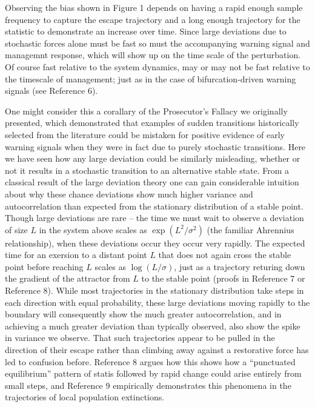 \documentclass[review]{elsarticle} %
\begin{document}
Observing the bias shown in Figure 1 depends on having a rapid enough
sample frequency to capture the escape trajectory and a long enough
trajectory for the statistic to demonstrate an increase over time. Since
large deviations due to stochastic forces alone must be fast so must the
accompanying warning signal and managemnt response, which will show up
on the time scale of the perturbation. Of course fast relative to the
system dynamics, may or may not be fast relative to the timescale of
management; just as in the case of bifurcation-driven warning signals
(see Reference 6).

One might consider this a corallary of the Prosecutor's Fallacy we
originally presented, which demonstrated that examples of sudden
transitions historically selected from the literature could be mistaken
for positive evidence of early warning signals when they were in fact
due to purely stochastic transitions. Here we have seen how any large
deviation could be similarly misleading, whether or not it results in a
stochastic transition to an alternative stable state. From a classical
result of the large deviation theory one can gain considerable intuition
about why these chance deviations show much higher variance and
autocorrelation than expected from the stationary distribution of a
stable point. Though large deviations are rare -- the time we must wait
to observe a deviation of size $L$ in the system above scales as
$\exp\left(L^2/\sigma^2\right)$ (the familiar Ahrennius relationship),
when these deviations occur they occur very rapidly. The expected time
for an exersion to a distant point $L$ that does not again cross the
stable point before reaching $L$ scales as $\log(L/\sigma)$, just as a
trajectory returing down the gradient of the attractor from $L$ to the
stable point (proofs in Reference 7 or Reference 8). While most
trajectories in the stationary distribution take steps in each direction
with equal probability, these large deviations moving rapidly to the
boundary will consequently show the much greater autocorrelation, and in
achieving a much greater deviation than typically observed, also show
the spike in variance we observe. That such trajectories appear to be
pulled in the direction of their escape rather than climbing away
against a restorative force has led to confusion before. Reference 8
argues how this shows how a ``punctuated equilibrium'' pattern of statis
followed by rapid change could arise entirely from small steps, and
Reference 9 empirically demonstrates this phenomena in the trajectories
of local population extinctions.
\end{document}
